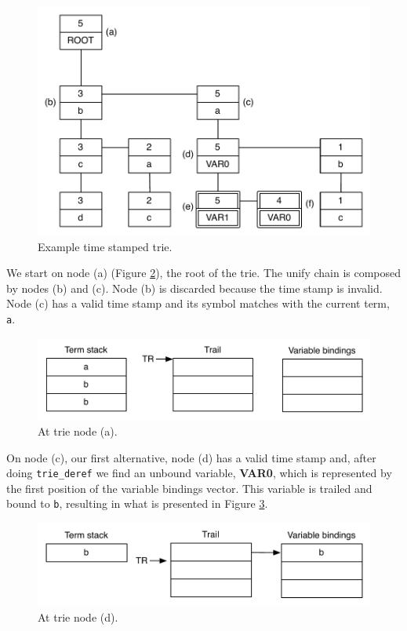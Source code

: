 \begin{figure}[H]
  \centering
    \includegraphics[scale=0.6]{collect_example_1.pdf}
  \caption{Example time stamped trie.}
  \label{fig:collect_example_1}
\end{figure}

We start on node (a) (Figure \ref{fig:collect_ex1}), the root of the trie. The unify chain
is composed by nodes (b) and (c). Node (b) is discarded because the time stamp is invalid.
Node (c) has a valid time stamp and its symbol matches with the current term, \texttt{a}.

\begin{figure}[H]
  \centering
    \includegraphics[scale=0.6]{collect_ex1.pdf}
  \caption{At trie node (a).}
  \label{fig:collect_ex1}
\end{figure}

On node (c), our first alternative, node (d) has a valid time stamp and, after doing
\texttt{trie\_deref} we find an unbound variable, \textbf{VAR0}, which is represented
by the first position of the variable bindings vector.
This variable is trailed and bound to \texttt{b},
resulting in what is presented in Figure \ref{fig:collect_ex2}.

\begin{figure}[H]
  \centering
    \includegraphics[scale=0.6]{collect_ex2.pdf}
  \caption{At trie node (d).}
  \label{fig:collect_ex2}
\end{figure}

